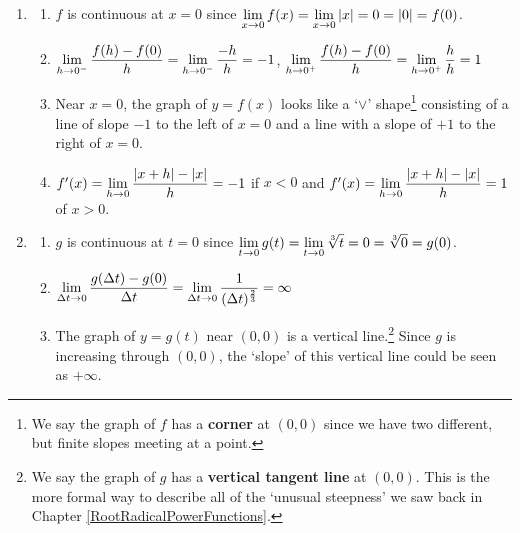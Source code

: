 \begin{enumerate}
\setcounter{enumi}{\value{HW}}

\item \begin{enumerate} \item  $f$ is continuous at $x=0$ since $\displaystyle{\lim_{x \rightarrow 0} f(x) = \lim_{x \rightarrow 0} |x| = 0 = |0| = f(0)}$.

\smallskip

\item   $\displaystyle{\lim_{h \rightarrow 0^{-}} \dfrac{f(h) - f(0)}{h} = \lim_{h \rightarrow 0^{-}} \dfrac{-h}{h}  =-1}$,  $\displaystyle{\lim_{h \rightarrow 0^{+}} \dfrac{f(h) - f(0)}{h} = \lim_{h \rightarrow 0^{+}} \dfrac{h}{h}  = 1}$

\smallskip
        
\item  Near $x = 0$, the graph of $y = f(x)$ looks like a `$\vee$' shape\footnote{We say the graph of $f$ has a  \textbf{corner} at $(0,0)$ since we have two different, but finite slopes meeting at a point.} consisting of a line of slope $-1$ to the left of $x=0$ and a line with a slope of $+1$ to the right of $x = 0$.

\smallskip

\item  $f'(x) =  \displaystyle{\lim_{h \rightarrow 0} \dfrac{|x+h| - |x|}{h} = -1}$ if $x < 0$ and $f'(x) =  \displaystyle{\lim_{h \rightarrow 0} \dfrac{|x+h| - |x|}{h} = 1}$ of $x > 0$.

\smallskip

\end{enumerate}



\item \begin{enumerate}

\item  $g$ is continuous at $t=0$ since $\displaystyle{\lim_{t \rightarrow 0} g(t) = \lim_{t \rightarrow 0} \sqrt[3]{t} = 0 = \sqrt[3]{0} = g(0)}$.

\smallskip

\item $\displaystyle{\lim_{\Delta t \rightarrow 0} \dfrac{g(\Delta t) - g(0)}{\Delta t} =   \lim_{\Delta t \rightarrow 0} \dfrac{1}{(\Delta t)^{\frac{2}{3}}}   =  \infty}$

\smallskip

        
\item  The graph of $y = g(t)$ near $(0,0)$ is a vertical line.\footnote{We say the graph of $g$ has a  \textbf{vertical tangent line} at $(0,0)$.  This is the more formal way to describe all of the `unusual steepness' we saw back in Chapter \ref{RootRadicalPowerFunctions}.}  Since $g$ is increasing through $(0,0)$, the `slope' of this vertical line could be seen as $+ \infty$. 


\end{enumerate}
\end{enumerate}
